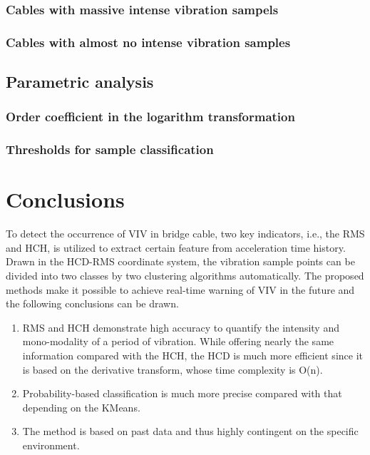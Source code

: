 \documentclass[preprint, 3p, times, compress, 11pt]{elsarticle}
\begin{document}
\subsubsection{Cables with massive intense vibration sampels}

\subsubsection{Cables with almost no intense vibration samples}

\subsection{Parametric analysis}

\subsubsection{Order coefficient in the logarithm transformation}

\subsubsection{Thresholds for sample classification}

\clearpage

\section{Conclusions}
\label{sec:conclusion}

To detect the occurrence of VIV in bridge cable, two key indicators, i.e., 
the RMS and HCH, is utilized to extract certain feature from acceleration 
time history. Drawn in the HCD-RMS coordinate system, the vibration sample 
points can be divided into two classes by two clustering algorithms 
automatically. The proposed methods make it possible to achieve real-time 
warning of VIV in the future and the following conclusions can be drawn.

\begin{enumerate}[(1)]
    \item 
RMS and HCH demonstrate high accuracy to quantify the intensity 
and mono-modality of a period of vibration. While offering nearly the 
same information compared with the HCH, the HCD is much more efficient 
since it is based on the derivative transform, whose time complexity is O(n).
    \item
Probability-based classification is much more precise compared with that 
depending on the KMeans.
    \item 
The method is based on past data and thus highly contingent on the specific 
environment.
\end{enumerate}


\end{document}
